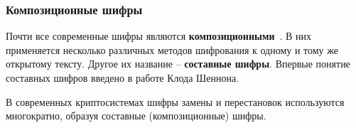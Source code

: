 \subsubsection{Композиционные шифры}

Почти все современные шифры являются \textbf{композиционными}~\cite{AlZKCh:2001}. В них применяется несколько различных методов шифрования к одному и тому же открытому тексту. Другое их название -- \textbf{составные шифры}. Впервые понятие составных шифров введено в работе Клода Шеннона.

В современных криптосистемах шифры замены и перестановок используются многократно, образуя составные (композиционные) шифры.


